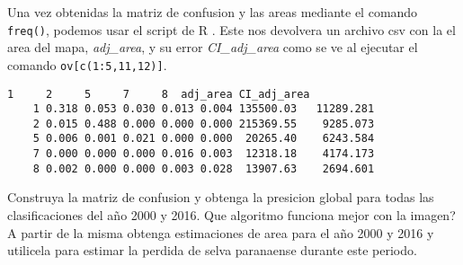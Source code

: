 \begin{exa}
  Una vez obtenidas la matriz de confusion y las areas mediante el comando
  \texttt{freq()}, podemos usar el script de R . Este nos devolvera
  un archivo csv con la el area del mapa, \emph{adj\_area}, y su error \emph{CI\_adj\_area}
  como se ve al ejecutar el comando \texttt{ov[c(1:5,11,12)]}.
  \begin{Verbatim}[fontsize=\small]
          1     2     5     7     8  adj_area CI_adj_area
    1 0.318 0.053 0.030 0.013 0.004 135500.03   11289.281
    2 0.015 0.488 0.000 0.000 0.000 215369.55    9285.073
    5 0.006 0.001 0.021 0.000 0.000  20265.40    6243.584
    7 0.000 0.000 0.000 0.016 0.003  12318.18    4174.173
    8 0.002 0.000 0.000 0.003 0.028  13907.63    2694.601
  \end{Verbatim}
\end{exa}


\begin{act}
    Construya la matriz de confusion y obtenga la presicion global para todas
    las clasificaciones del a\~no 2000 y 2016. Que algoritmo funciona mejor con la imagen? A partir
    de la misma obtenga estimaciones de area para el a\~no 2000 y 2016 y utilicela
    para estimar la perdida de selva paranaense durante este periodo.
\end{act}
